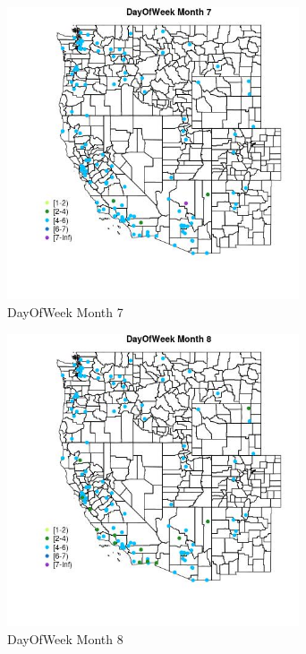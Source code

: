 \begin{figure} 
\centering  
\includegraphics[width=0.77\textwidth]{Code_Outputs/Report_ML_input_PM25_Step4_part_e_de_duplicated_aves_MapObsMo7DayOfWeek.jpg} 
\caption{\label{fig:Report_ML_input_PM25_Step4_part_e_de_duplicated_avesMapObsMo7DayOfWeek}DayOfWeek Month 7} 
\end{figure} 
 

\begin{figure} 
\centering  
\includegraphics[width=0.77\textwidth]{Code_Outputs/Report_ML_input_PM25_Step4_part_e_de_duplicated_aves_MapObsMo8DayOfWeek.jpg} 
\caption{\label{fig:Report_ML_input_PM25_Step4_part_e_de_duplicated_avesMapObsMo8DayOfWeek}DayOfWeek Month 8} 
\end{figure} 
 

